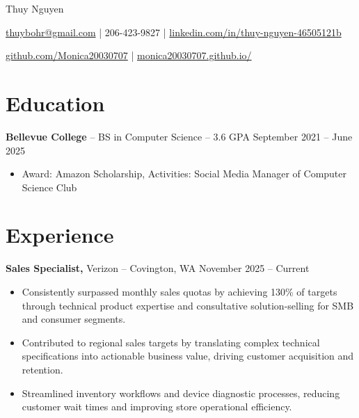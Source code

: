 \documentclass[11pt]{article}       %
\begin{document}
\centerline{\Huge Thuy Nguyen}

\vspace{5pt}

\centerline{\href{mailto:thuybohr@gmail.com}{thuybohr@gmail.com} | 206-423-9827 |
\href{https://www.linkedin.com/in/thuy-nguyen-46505121b/}{linkedin.com/in/thuy-nguyen-46505121b}}

\centerline{\href{https://github.com/Monica20030707}{github.com/Monica20030707} | 
\href{https://monica20030707.github.io/}{monica20030707.github.io/}} 

\vspace{-9pt}

\section*{Education}
\textbf{Bellevue College} -- BS in Computer Science -- 3.6 GPA \hfill September 2021 -- June 2025\\
\vspace{-9pt}
\begin{itemize}
  \item Award: Amazon Scholarship, Activities: Social Media Manager of Computer Science Club
\end{itemize}

\vspace{-18.5pt}

\section*{Experience}

\textbf{Sales Specialist,} {Verizon} -- Covington, WA \hfill November 2025 -- Current \\
\vspace{-9pt}
\begin{itemize}
  \item Consistently surpassed monthly sales quotas by achieving 130\% of targets through technical product expertise and consultative solution-selling for SMB and consumer segments.
  \item Contributed to regional sales targets by translating complex technical specifications into actionable business value, driving customer acquisition and retention.
  \item Streamlined inventory workflows and device diagnostic processes, reducing customer wait times and improving store operational efficiency.
\end{itemize}
\end{document}
